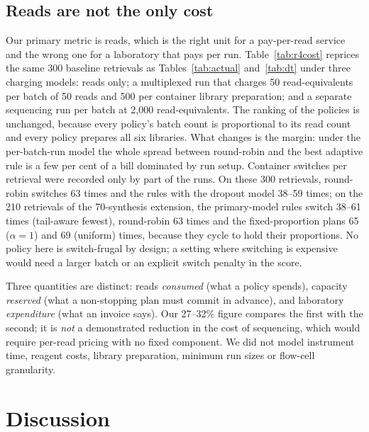 \documentclass[acmsmall,screen]{acmart}
\begin{document}
\subsection{Reads are not the only cost}\label{sec:res-cost}

Our primary metric is reads, which is the right unit for a pay-per-read service and the wrong one for a
laboratory that pays per run.  Table~\ref{tab:r4cost} reprices the same 300 baseline retrievals as
Tables~\ref{tab:actual} and~\ref{tab:dt} under three charging models: reads only; a multiplexed run that
charges 50 read-equivalents per batch of 50 reads and 500 per container library preparation; and a
separate sequencing run per batch at 2{,}000 read-equivalents.  The ranking of the policies is unchanged,
because every policy's batch count is proportional to its read count and every policy prepares all six
libraries.  What changes is the margin: under the per-batch-run model the whole spread between
round-robin and the best adaptive rule is a few per cent of a bill dominated by run setup.  Container
switches per retrieval were recorded only by part of the runs.  On these 300 retrievals, round-robin
switches 63 times and the rules with the dropout model 38--59 times; on the 210 retrievals of
the 70-synthesis extension, the primary-model rules switch 38--61 times (tail-aware fewest), round-robin
63 times and the fixed-proportion plans 65 ($\alpha{=}1$) and 69 (uniform) times, because they cycle to
hold their proportions.  No policy here is switch-frugal by design; a setting where switching is
expensive would need a larger batch or an explicit switch penalty in the score.

Three quantities are distinct: reads \emph{consumed} (what a policy spends), capacity \emph{reserved}
(what a non-stopping plan must commit in advance), and laboratory \emph{expenditure} (what an invoice
says).  Our 27--32\% figure compares the first with the second; it is \emph{not} a demonstrated
reduction in the cost of sequencing, which would require per-read pricing with no fixed component.  We
did not model instrument time, reagent costs, library preparation, minimum run sizes or flow-cell
granularity.

\section{Discussion}\label{sec:disc}
\end{document}

